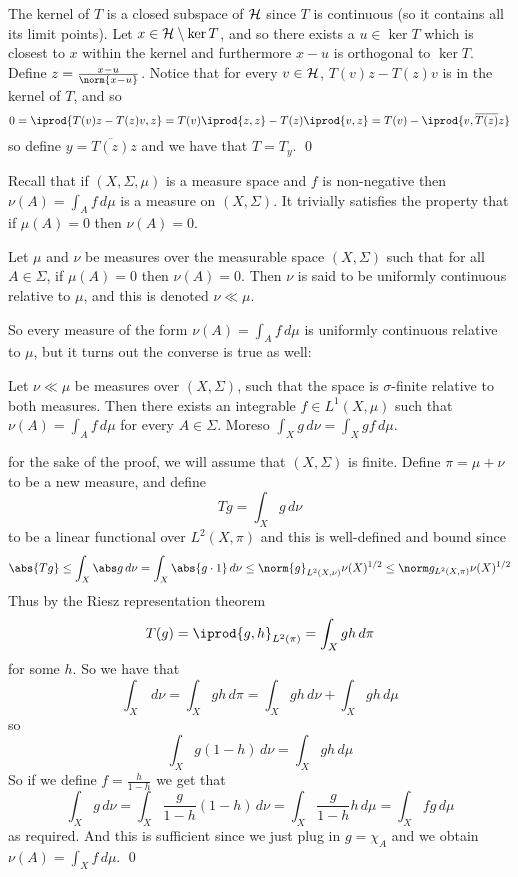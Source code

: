 The kernel of $T$ is a closed subspace of ${\cal H}$ since $T$ is continuous (so it contains all its limit points).
Let $x\in{\cal H}\setminus\ker T$, and so there exists a $u\in\ker T$ which is closest to $x$ within the kernel and furthermore $x-u$ is orthogonal to $\ker T$.
Define $z=\frac{x-u}{\norm{x-u}}$.
Notice that for every $v\in{\cal H}$, $T(v)z-T(z)v$ is in the kernel of $T$, and so
$$ 0 = \iprod{T(v)z-T(z)v,z} = T(v)\iprod{z,z} - T(z)\iprod{v,z} = T(v) - \iprod{v,\overline{T(z)}z} $$
so define $y=\overline{T(z)}z$ and we have that $T=T_y$.
\qed

Recall that if $(X,\Sigma,\mu)$ is a measure space and $f$ is non-negative then $\nu(A)=\int_Af\,d\mu$ is a measure on $(X,\Sigma)$.
It trivially satisfies the property that if $\mu(A)=0$ then $\nu(A)=0$.

\bdefn

    Let $\mu$ and $\nu$ be measures over the measurable space $(X,\Sigma)$ such that for all $A\in\Sigma$, if $\mu(A)=0$ then $\nu(A)=0$.
    Then $\nu$ is said to be {\emphcolor uniformly continuous} relative to $\mu$, and this is denoted $\nu\ll\mu$.

\edefn

So every measure of the form $\nu(A)=\int_Af\,d\mu$ is uniformly continuous relative to $\mu$, but it turns out the converse is true as well:

\bthrm[title=Radon-Nikodym, name=radonnikodym]

    Let $\nu\ll\mu$ be measures over $(X,\Sigma)$, such that the space is $\sigma$-finite relative to both measures.
    Then there exists an integrable $f\in L^1(X,\mu)$ such that $\nu(A)=\int_Af\,d\mu$ for every $A\in\Sigma$.
    Moreso $\int_Xg\,d\nu=\int_Xgf\,d\mu$.

\ethrm

\Proof for the sake of the proof, we will assume that $(X,\Sigma)$ is finite.
Define $\pi=\mu+\nu$ to be a new measure, and define
$$ Tg = \int_Xg\,d\nu $$
to be a linear functional over $L^2(X,\pi)$ and this is well-defined and bound since
$$ \abs{Tg} \leq \int_X\abs g\,d\nu = \int_X\abs{g\cdot1}\,d\nu \leq \norm{g}_{L^2(X,\nu)}\nu(X)^{1/2} \leq\norm g_{L^2(X,\pi)}\nu(X)^{1/2} $$
Thus by the Riesz representation theorem
$$ T(g)=\iprod{g,h}_{L^2(\pi)} = \int_Xgh\,d\pi $$
for some $h$.
So we have that
$$ \int_X\,d\nu = \int_Xgh\,d\pi = \int_Xgh\,d\nu + \int_Xgh\,d\mu $$
so
$$ \int_X g(1-h)\,d\nu = \int_Xgh\,d\mu $$
So if we define $f=\frac h{1-h}$ we get that
$$ \int_X g\,d\nu = \int_X \frac g{1-h}(1-h)\,d\nu = \int_X\frac g{1-h}h\,d\mu = \int_X fg\,d\mu $$
as required.
And this is sufficient since we just plug in $g=\chi_A$ and we obtain $\nu(A)=\int_Xf\,d\mu$.
\qed

\bye

